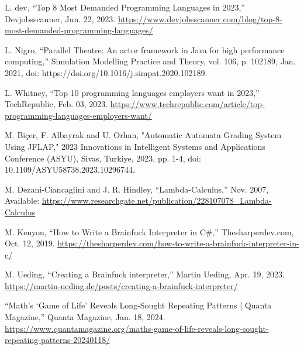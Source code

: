 \documentclass[12pt]{report} %
\begin{document}
\begin{singlespace}
\begin{thebibliography}{}
             L. dev, “Top 8 Most Demanded Programming Languages in 2023,” Devjobsscanner, Jun. 22, 2023. \href{https://www.devjobsscanner.com/blog/top-8-most-demanded-programming-languages/}{https://www.devjobsscanner.com/blog/top-8-most-demanded-programming-languages/}
            
             L. Nigro, “Parallel Theatre: An actor framework in Java for high performance computing,” Simulation Modelling Practice and Theory, vol. 106, p. 102189, Jan. 2021, doi: https://doi.org/10.1016/j.simpat.2020.102189. 
            
             L. Whitney, “Top 10 programming languages employers want in 2023,” TechRepublic, Feb. 03, 2023. \href{https://www.techrepublic.com/article/top-programming-languages-employers-want/}{https://www.techrepublic.com/article/top-programming-languages-employers-want/}
            
             M. Biçer, F. Albayrak and U. Orhan, "Automatic Automata Grading System Using JFLAP," 2023 Innovations in Intelligent Systems and Applications Conference (ASYU), Sivas, Turkiye, 2023, pp. 1-4, doi: 10.1109/ASYU58738.2023.10296744.
            
             M. Dezani-Ciancaglini and J. R. Hindley, “Lambda-Calculus,” Nov. 2007, Available: \href{https://www.researchgate.net/publication/228107078_Lambda-Calculus}{https://www.researchgate.net/publication/228107078\_Lambda-Calculus}
            
             M. Kenyon, “How to Write a Brainfuck Interpreter in C\#,” Thesharperdev.com, Oct. 12, 2019. \href{https://thesharperdev.com/how-to-write-a-brainfuck-interpreter-in-c/}{https://thesharperdev.com/how-to-write-a-brainfuck-interpreter-in-c/}
            
             M. Ueding, “Creating a Brainfuck interpreter,” Martin Ueding, Apr. 19, 2023. \href{https://martin-ueding.de/posts/creating-a-brainfuck-interpreter/}{https://martin-ueding.de/posts/creating-a-brainfuck-interpreter/}
            
             “Math’s ‘Game of Life’ Reveals Long-Sought Repeating Patterns | Quanta Magazine,” Quanta Magazine, Jan. 18, 2024. \href{https://www.quantamagazine.org/maths-game-of-life-reveals-long-sought-repeating-patterns-20240118/}{https://www.quantamagazine.org/maths-game-of-life-reveals-long-sought-repeating-patterns-20240118/}
            

\end{thebibliography}
\end{singlespace}
\end{document}
